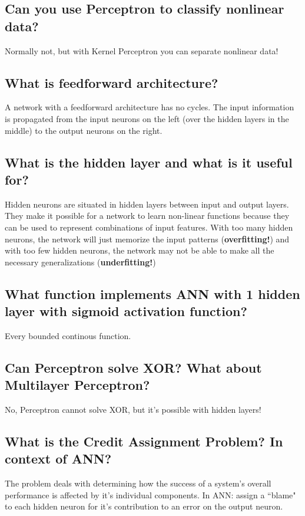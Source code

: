 \documentclass[12pt]{scrartcl}
\begin{document}
\subsection{Can you use Perceptron to classify nonlinear data?}
Normally not, but with Kernel Perceptron you can separate nonlinear data!

\subsection{What is feedforward architecture?}
A network with a feedforward architecture has no cycles. The input information is propagated from the input neurons on the left (over the hidden layers in the middle) to the output neurons on the right.

\subsection{What is the hidden layer and what is it useful for?}
Hidden neurons are situated in hidden layers between input and output layers. They make it possible for a network to learn non-linear functions because they can be used to represent combinations of input features. With too many hidden neurons, the network will just memorize the input patterns ({\bf overfitting!}) and with too few hidden neurons, the network may not be able to make all the necessary generalizations ({\bf underfitting!})

\subsection{What function implements ANN with 1 hidden layer with sigmoid activation function?}
Every bounded continous function.

\subsection{Can Perceptron solve XOR? What about Multilayer Perceptron?}
No, Perceptron cannot solve XOR, but it's possible with hidden layers!

\subsection{What is the Credit Assignment Problem? In context of ANN?}
The problem deals with determining how the success of a system's overall performance is affected by it's individual components. In ANN: assign a ``blame" to each hidden neuron for it's contribution to an error on the output neuron.
\end{document}
